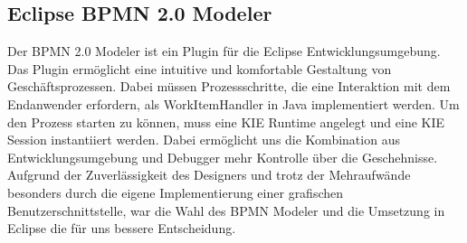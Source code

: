 \subsection{Eclipse BPMN 2.0 Modeler}
Der BPMN 2.0 Modeler ist ein Plugin für die Eclipse Entwicklungsumgebung. Das Plugin ermöglicht eine intuitive und komfortable Gestaltung von Geschäftsprozessen. Dabei müssen Prozessschritte, die eine Interaktion mit dem Endanwender erfordern, als WorkItemHandler in Java implementiert werden. Um den Prozess starten zu können, muss eine KIE Runtime angelegt und eine KIE Session instantiiert werden. Dabei ermöglicht uns die Kombination aus Entwicklungsumgebung und Debugger mehr Kontrolle über die Geschehnisse. Aufgrund der Zuverlässigkeit des Designers und trotz der Mehraufwände besonders durch die eigene Implementierung einer grafischen Benutzerschnittstelle, war die Wahl des BPMN Modeler und die Umsetzung in Eclipse die für uns bessere Entscheidung. 